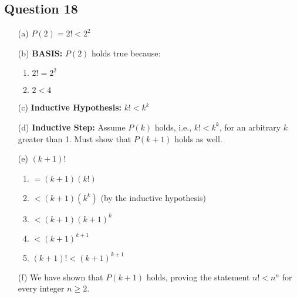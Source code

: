 \documentclass{article}
\begin{document}
\subsection*{Question 18}
\begin{itemize}
    \item[(a)] \( P(2) = 2! < 2^2 \)
    \item[(b)] \textbf{BASIS:} \( P(2) \) holds true because:
    \begin{enumerate}
        \item \( 2! = 2^2 \)
        \item \( 2 < 4 \)
    \end{enumerate}
    \item[(c)] \textbf{Inductive Hypothesis:} \( k! < k^k \)
    \item[(d)] \textbf{Inductive Step:} Assume \( P(k) \) holds, i.e., \( k! < k^k \), for an arbitrary \( k \) greater than 1. Must show that \( P(k + 1) \) holds as well.
    \item[(e)] \( (k + 1)! \)
    \begin{enumerate}
        \item \( = (k + 1)(k!) \)
        \item \( < (k + 1)(k^k) \) \hspace{10pt} (by the inductive hypothesis)
        \item \( < (k + 1)(k + 1)^k \)
        \item \( < (k + 1)^{k + 1} \)
        \item \( (k + 1)! < (k + 1)^{k + 1} \)
    \end{enumerate}
    \item[(f)] We have shown that \( P(k + 1) \) holds, proving the statement \( n! < n^n \) for every integer \( n \geq 2 \).
\end{itemize}

\end{document}
